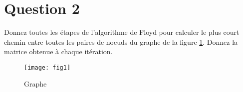 \documentclass[devoir3.tex]{subfiles}
\begin{document}
\section*{Question 2}
Donnez toutes les étapes de l’algorithme de Floyd pour calculer le plus court chemin entre toutes les paires de noeuds du graphe de la figure \ref{fig:fig1}. Donnez la matrice obtenue à chaque itération.

\begin{figure}[H]
	\centering
	\texttt{[image: fig1]}
	\caption{Graphe}
	\label{fig:fig1}   
\end{figure}
\end{document}
